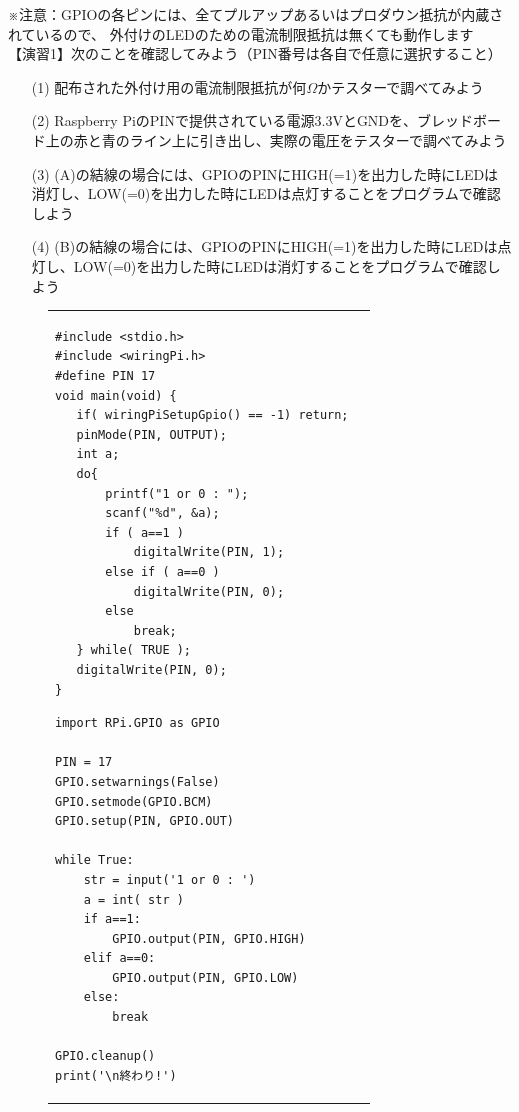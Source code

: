 \documentclass[uplatex,a4paper,11pt,oneside,openany]{jsbook}
\begin{document}
※注意：GPIOの各ピンには、全てプルアップあるいはプロダウン抵抗が内蔵されているので、
外付けのLEDのための電流制限抵抗は無くても動作します\\

【演習1】次のことを確認してみよう（PIN番号は各自で任意に選択すること）

\begin{enumerate}
\item[(1)] 配布された外付け用の電流制限抵抗が何$\Omega$かテスターで調べてみよう
\item[(2)] Raspberry PiのPINで提供されている電源3.3VとGNDを、ブレッドボード上の赤と青のライン上に引き出し、実際の電圧をテスターで調べてみよう
\item[(3)] (A)の結線の場合には、GPIOのPINにHIGH(=1)を出力した時にLEDは消灯し、LOW(=0)を出力した時にLEDは点灯することをプログラムで確認しよう
\item[(4)] (B)の結線の場合には、GPIOのPINにHIGH(=1)を出力した時にLEDは点灯し、LOW(=0)を出力した時にLEDは消灯することをプログラムで確認しよう
\end{enumerate}

\begin{figure}[htpb]
    \begin{tabular}{lr}
      \begin{minipage}{0.55\hsize}
\begin{lstlisting}[caption=LED(C言語),label=prog2]
#include <stdio.h>
#include <wiringPi.h>
#define PIN 17
void main(void) {
   if( wiringPiSetupGpio() == -1) return;
   pinMode(PIN, OUTPUT);
   int a;
   do{
       printf("1 or 0 : ");
       scanf("%d", &a);
       if ( a==1 )
           digitalWrite(PIN, 1);
       else if ( a==0 )
           digitalWrite(PIN, 0);
       else
           break;
   } while( TRUE );
   digitalWrite(PIN, 0);
}
\end{lstlisting}
    \end{minipage}
    \begin{minipage}{0.5\hsize}
    \begin{lstlisting}[caption=LED(Python),label=prog1]
import RPi.GPIO as GPIO

PIN = 17
GPIO.setwarnings(False)
GPIO.setmode(GPIO.BCM)
GPIO.setup(PIN, GPIO.OUT)

while True:
    str = input('1 or 0 : ')
    a = int( str )
    if a==1:
        GPIO.output(PIN, GPIO.HIGH)
    elif a==0:
        GPIO.output(PIN, GPIO.LOW)
    else:
        break

GPIO.cleanup()
print('\n終わり!')
    \end{lstlisting}%
    \end{minipage}
  \end{tabular}
\end{figure}
\end{document}
